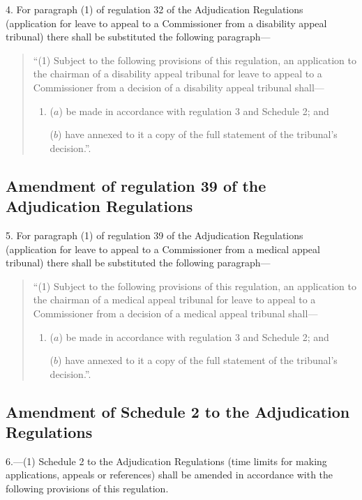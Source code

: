 \documentclass[12pt,a4paper]{article}
\begin{document}
4.  For paragraph (1) of regulation 32 of the Adjudication Regulations (application for leave to appeal to a Commissioner from a disability appeal tribunal) there shall be substituted the following paragraph—
\begin{quotation}
“(1) Subject to the following provisions of this regulation, an application to the chairman of a disability appeal tribunal for leave to appeal to a Commissioner from a decision of a disability appeal tribunal shall—
\begin{enumerate}\item[]
($a$) be made in accordance with regulation 3 and Schedule 2; and

($b$) have annexed to it a copy of the full statement of the tribunal’s decision.”.
\end{enumerate}
\end{quotation}

\subsection[5. Amendment of regulation 39 of the Adjudication Regulations]{Amendment of regulation 39 of the Adjudication Regulations}

5.  For paragraph (1) of regulation 39 of the Adjudication Regulations (application for leave to appeal to a Commissioner from a medical appeal tribunal) there shall be substituted the following paragraph—
\begin{quotation}
“(1) Subject to the following provisions of this regulation, an application to the chairman of a medical appeal tribunal for leave to appeal to a Commissioner from a decision of a medical appeal tribunal shall—
\begin{enumerate}\item[]
($a$) be made in accordance with regulation 3 and Schedule 2; and

($b$) have annexed to it a copy of the full statement of the tribunal’s decision.”.
\end{enumerate}
\end{quotation}

\subsection[6. Amendment of Schedule 2 to the Adjudication Regulations]{Amendment of Schedule 2 to the Adjudication Regulations}

6.—(1) Schedule 2 to the Adjudication Regulations (time limits for making applications, appeals or references) shall be amended in accordance with the following provisions of this regulation.
\end{document}
